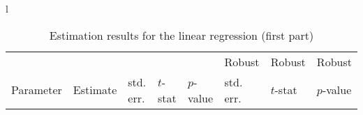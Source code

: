 \documentclass[12pt,a4paper]{article}
\begin{document}
\begin{sidewaystable}[htb]
\caption{\label{tab:regression}Estimation results for the linear
  regression (first part)}
  \begin{tabular}{l}
\begin{tabular}{lr@{.}lr@{.}lr@{.}lr@{.}lr@{.}lr@{.}lr@{.}l}
                      &   \multicolumn{2}{l}{}    & \multicolumn{2}{l}{} & \multicolumn{2}{l}{}  &     \multicolumn{2}{l}{} &   \multicolumn{2}{l}{Robust}    & \multicolumn{2}{l}{Robust}  &     \multicolumn{2}{l}{Robust}   \\
Parameter      & \multicolumn{2}{l}{Estimate}  &
\multicolumn{2}{l}{std. err.}  &  \multicolumn{2}{l}{$t$-stat}  &   \multicolumn{2}{l}{$p$-value}  &
\multicolumn{2}{l}{std. err.}  &  \multicolumn{2}{l}{$t$-stat}  &   \multicolumn{2}{l}{$p$-value}   \\


\end{tabular}
\end{tabular}
\end{sidewaystable}
\end{document}
